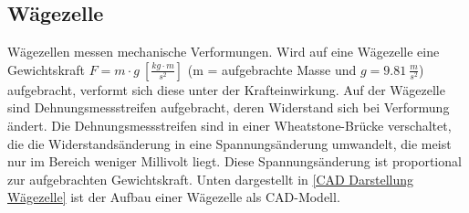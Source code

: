 \subsection{Wägezelle}

Wägezellen messen mechanische Verformungen.
Wird auf eine Wägezelle eine Gewichtskraft \mbox{$F = m \cdot g \: [\frac{kg \cdot m}{s^2}]$} (m = aufgebrachte Masse und $g = 9.81 \: \frac{m}{s^2}$)  aufgebracht, verformt sich diese unter der Krafteinwirkung.
Auf der Wägezelle sind Dehnungsmessstreifen aufgebracht, deren Widerstand sich bei Verformung ändert.
Die Dehnungsmessstreifen sind in einer Wheatstone-Brücke verschaltet, die die Widerstandsänderung in eine Spannungsänderung umwandelt, die meist nur im Bereich weniger Millivolt liegt.
Diese Spannungsänderung ist proportional zur aufgebrachten Gewichtskraft. Unten dargestellt in \autoref{CAD Darstellung Wägezelle} ist der Aufbau einer Wägezelle als CAD-Modell. \\
